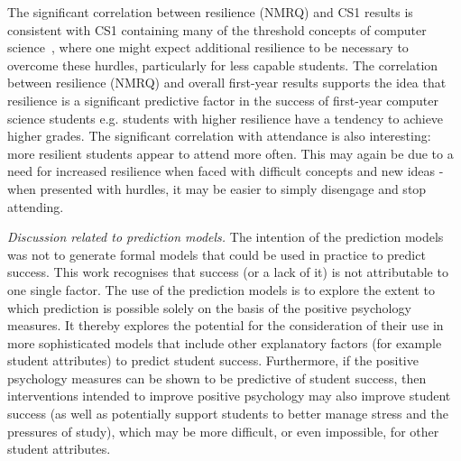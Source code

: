 \documentclass[sigconf]{acmart}
\begin{document}
The significant correlation between resilience (NMRQ) and CS1 results is consistent with CS1 containing many of the threshold concepts of computer science~\cite{Sanders:2016:TCC:2999541.2999546}, where one might expect additional resilience to be necessary to overcome these hurdles, particularly for less capable students.  The correlation between resilience (NMRQ) and overall first-year results supports the idea that resilience is a significant predictive factor in the success of first-year computer science students e.g. students with higher resilience have a tendency to achieve higher grades. The significant correlation with attendance is also interesting: more resilient students appear to attend more often. This may again be due to a need for increased resilience when faced with difficult concepts and new ideas - when presented with hurdles, it may be easier to simply disengage and stop attending.
 
{\em Discussion related to prediction models. }
The intention of the prediction models was not to generate formal models that could be used in practice to predict success. This work recognises that success (or a lack of it) is not attributable to one single factor. The use of the prediction models is to explore the extent to which prediction is possible solely on the basis of the positive psychology measures.  It thereby explores the potential for the consideration of their use in more sophisticated models that include other explanatory factors (for example student attributes) to predict student success. Furthermore, if the positive psychology measures can be shown to be predictive of student success, then interventions intended to improve positive psychology may also improve student success (as well as potentially support students to better manage stress and the pressures of study), which may be more difficult, or even impossible, for other student attributes.
\end{document}
